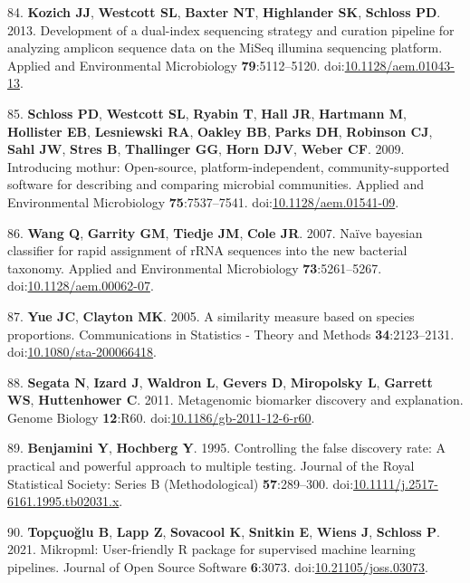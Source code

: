\documentclass[
  12pt,
]{article}
\newenvironment{cslreferences}%
  {}%
  {\par}
\begin{document}
\begin{cslreferences}
\leavevmode\hypertarget{ref-Kozich2013}{}%
84. \textbf{Kozich JJ}, \textbf{Westcott SL}, \textbf{Baxter NT},
\textbf{Highlander SK}, \textbf{Schloss PD}. 2013. Development of a
dual-index sequencing strategy and curation pipeline for analyzing
amplicon sequence data on the MiSeq illumina sequencing platform.
Applied and Environmental Microbiology \textbf{79}:5112--5120.
doi:\href{https://doi.org/10.1128/aem.01043-13}{10.1128/aem.01043-13}.

\leavevmode\hypertarget{ref-Schloss2009}{}%
85. \textbf{Schloss PD}, \textbf{Westcott SL}, \textbf{Ryabin T},
\textbf{Hall JR}, \textbf{Hartmann M}, \textbf{Hollister EB},
\textbf{Lesniewski RA}, \textbf{Oakley BB}, \textbf{Parks DH},
\textbf{Robinson CJ}, \textbf{Sahl JW}, \textbf{Stres B},
\textbf{Thallinger GG}, \textbf{Horn DJV}, \textbf{Weber CF}. 2009.
Introducing mothur: Open-source, platform-independent,
community-supported software for describing and comparing microbial
communities. Applied and Environmental Microbiology
\textbf{75}:7537--7541.
doi:\href{https://doi.org/10.1128/aem.01541-09}{10.1128/aem.01541-09}.

\leavevmode\hypertarget{ref-Wang2007}{}%
86. \textbf{Wang Q}, \textbf{Garrity GM}, \textbf{Tiedje JM},
\textbf{Cole JR}. 2007. Naïve bayesian classifier for rapid assignment
of rRNA sequences into the new bacterial taxonomy. Applied and
Environmental Microbiology \textbf{73}:5261--5267.
doi:\href{https://doi.org/10.1128/aem.00062-07}{10.1128/aem.00062-07}.

\leavevmode\hypertarget{ref-Yue2005}{}%
87. \textbf{Yue JC}, \textbf{Clayton MK}. 2005. A similarity measure
based on species proportions. Communications in Statistics - Theory and
Methods \textbf{34}:2123--2131.
doi:\href{https://doi.org/10.1080/sta-200066418}{10.1080/sta-200066418}.

\leavevmode\hypertarget{ref-Segata2011}{}%
88. \textbf{Segata N}, \textbf{Izard J}, \textbf{Waldron L},
\textbf{Gevers D}, \textbf{Miropolsky L}, \textbf{Garrett WS},
\textbf{Huttenhower C}. 2011. Metagenomic biomarker discovery and
explanation. Genome Biology \textbf{12}:R60.
doi:\href{https://doi.org/10.1186/gb-2011-12-6-r60}{10.1186/gb-2011-12-6-r60}.

\leavevmode\hypertarget{ref-Benjamini1995}{}%
89. \textbf{Benjamini Y}, \textbf{Hochberg Y}. 1995. Controlling the
false discovery rate: A practical and powerful approach to multiple
testing. Journal of the Royal Statistical Society: Series B
(Methodological) \textbf{57}:289--300.
doi:\href{https://doi.org/10.1111/j.2517-6161.1995.tb02031.x}{10.1111/j.2517-6161.1995.tb02031.x}.

\leavevmode\hypertarget{ref-Topcuoglu2021}{}%
90. \textbf{Topçuoğlu B}, \textbf{Lapp Z}, \textbf{Sovacool K},
\textbf{Snitkin E}, \textbf{Wiens J}, \textbf{Schloss P}. 2021.
Mikropml: User-friendly R package for supervised machine learning
pipelines. Journal of Open Source Software \textbf{6}:3073.
doi:\href{https://doi.org/10.21105/joss.03073}{10.21105/joss.03073}.
\end{cslreferences}
\end{document}
